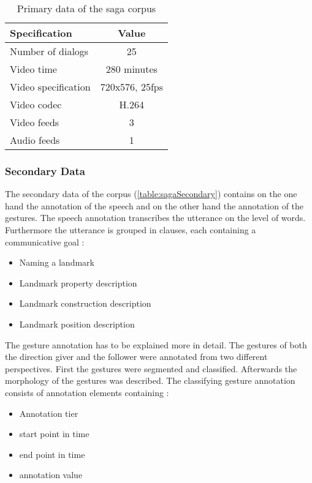 \documentclass[a4paper]{article}
\begin{document}
				\begin{table}
					\center
					\begin{tabular}{|l|c|}
						\hline 
						\textbf{Specification} & \textbf{Value} \\ 
						\hline 
						Number of dialogs & 25 \\ 
						\hline 
						Video time & 280 minutes \\ 
						\hline 
						Video specification & 720x576, 25fps  \\ 
						\hline 
						Video codec & H.264  \\ 
						\hline 
						Video feeds & 3 \\ 
						\hline 
						Audio feeds & 1 \\ 
						\hline
					\end{tabular} 
					\caption{Primary data of the \gls{saga} corpus \cite{Bielefeld2010, BAS2014}}
					\label{table:sagaPrimary}
				\end{table}
				
			\subsubsection{Secondary Data}
				The secondary data of the corpus (\ref{table:sagaSecondary}) contains on the one hand the annotation of the speech and on the other hand the annotation of the gestures. The speech annotation transcribes the utterance on the level of words. Furthermore the utterance is grouped in clauses, each containing a communicative goal \cite[ch. 2]{Bielefeld2010}:
				\begin{itemize}
					\item Naming a landmark
					\item Landmark property description
					\item Landmark construction description
					\item Landmark position description
				\end{itemize}
				
				The gesture annotation has to be explained more in detail. The gestures of both the direction giver and the follower were annotated from two different perspectives. First the gestures were segmented and classified. Afterwards the morphology of the gestures was described. The classifying gesture annotation consists of annotation elements containing \cite[ch. 1.3]{Bergmann2014}:
				
				\begin{itemize}
					\item Annotation tier
					\item start point in time
					\item end point in time
					\item annotation value
				\end{itemize}								
				
\end{document}
